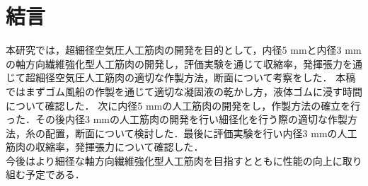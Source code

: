 \newpage
\section{結言}
本研究では，超細径空気圧人工筋肉の開発を目的として，内径5 mmと内径3 mmの軸方向繊維強化型人工筋肉の開発し，評価実験を通じて収縮率，発揮張力を通じて超細径空気圧人工筋肉の適切な作製方法，断面について考察をした．
本稿ではまずゴム風船の作製を通じて適切な凝固液の乾かし方，液体ゴムに浸す時間について確認した．
次に内径5 mmの人工筋肉の開発をし，作製方法の確立を行った．その後内径3 mmの人工筋肉の開発を行い細径化を行う際の適切な作製方法，糸の配置，断面について検討した．最後に評価実験を行い内径3 mmの人工筋肉の収縮率，発揮張力について確認した．\\
今後はより細径な軸方向繊維強化型人工筋肉を目指すとともに性能の向上に取り組む予定である．
